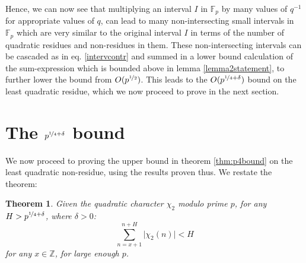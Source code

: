 \documentclass{report}
\newtheorem*{theorem*}{Theorem}
\begin{document}
Hence, we can now see that multiplying an interval $I$ in $\mathbb{F}_p$ by many values of $q^{-1}$ for appropriate values of $q$, can lead to many non-intersecting small intervals in $\mathbb{F}_p$ which are very similar to the original interval $I$ in terms of the number of quadratic residues and non-residues in them. These non-intersecting intervals can be cascaded as in eq. \ref{intervcontr} and summed in a lower bound calculation of the sum-expression which is bounded above in lemma \ref{lemma2statement}, to further lower the bound from $O(p^{\nicefrac{1}{2}})$. This leads to the $O(p^{\nicefrac{1}{4}+\delta})$ bound on the least quadratic residue, which we now proceed to prove in the next section.
%
%
\section{The $p^{\nicefrac{1}{4}+\delta}$ bound}
We now proceed to proving the upper bound in theorem \ref{thm:p4bound} on the least quadratic non-residue, using the results proven thus. We restate the theorem:
\begin{theorem*}
Given the quadratic character $\chi_2$ modulo prime $p$, for any $H>p^{\nicefrac{1}{4}+\delta}$, where $\delta>0$:
\[\sum\limits_{n=x+1}^{n+H}\lvert\chi_2(n)\rvert<H\]
for any $x\in\mathbb{Z}$, for large enough $p$.
\end{theorem*}
\end{document}
